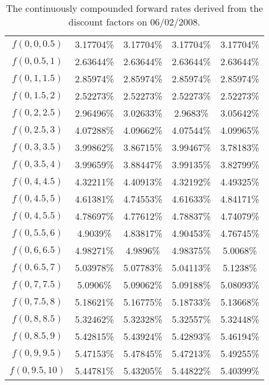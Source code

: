 \begin{landscape}
\begin{table}[ht]
\begin{center}
\begin{tabular}{c|c|c|c|c}
\toprule
$f(0,0,0.5)$ & 3.17704\% & 3.17704\% & 3.17704\% & 3.17704\% \\
$f(0,0.5,1)$ & 2.63644\% & 2.63644\% & 2.63644\% & 2.63644\% \\
$f(0,1,1.5)$ & 2.85974\% & 2.85974\% & 2.85974\% & 2.85974\% \\
$f(0,1.5,2)$ & 2.52273\% & 2.52273\% & 2.52273\% & 2.52273\% \\
$f(0,2,2.5)$ & 2.96496\% & 3.02633\% & 2.9683\% & 3.05642\% \\
$f(0,2.5,3)$ & 4.07288\% & 4.09662\% & 4.07544\% & 4.09965\% \\
$f(0,3,3.5)$ & 3.99862\% & 3.86715\% & 3.99467\% & 3.78183\% \\
$f(0,3.5,4)$ & 3.99659\% & 3.88447\% & 3.99135\% & 3.82799\% \\
$f(0,4,4.5)$ & 4.32211\% & 4.40913\% & 4.32192\% & 4.49325\% \\
$f(0,4.5,5)$ & 4.61381\% & 4.74553\% & 4.61633\% & 4.84171\% \\
$f(0,4,5.5)$ & 4.78697\% & 4.77612\% & 4.78837\% & 4.74079\% \\
$f(0,5.5,6)$ & 4.9039\% & 4.83817\% & 4.90453\% & 4.76745\% \\
$f(0,6,6.5)$ & 4.98271\% & 4.9896\% & 4.98375\% & 5.0068\% \\
$f(0,6.5,7)$ & 5.03978\% & 5.07783\% & 5.04113\% & 5.1238\% \\
$f(0,7,7.5)$ & 5.0906\% & 5.09062\% & 5.09188\% & 5.08093\% \\
$f(0,7.5,8)$ & 5.18621\% & 5.16775\% & 5.18733\% & 5.13668\% \\
$f(0,8,8.5)$ & 5.32462\% & 5.32328\% & 5.32557\% & 5.32448\% \\
$f(0,8.5,9)$ & 5.42815\% & 5.43924\% & 5.42893\% & 5.46194\% \\
$f(0,9,9.5)$ & 5.47153\% & 5.47845\% & 5.47213\% & 5.49255\% \\
$f(0,9.5,10)$ & 5.44781\% & 5.43205\% & 5.44822\% & 5.40399\% \\
\toprule

\end{tabular}
\end{center}
\caption[Forward Rates|06/02/2008]{The continuously compounded forward rates derived from the discount factors on 06/02/2008.}
\label{tab:fwdresults_2}
\end{table}

\end{landscape}


